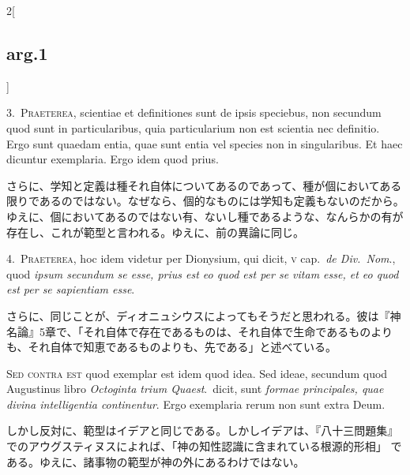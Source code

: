 \documentclass[paper=a4paper,fontsize=10pt,jafontsize=9pt,titlepage]{jlreq}
\begin{document}
\begin{paracol}{2}[\subsection{arg.1}]

3.~{\scshape Praeterea}, scientiae et definitiones sunt
de ipsis speciebus, non secundum quod sunt in particularibus, quia
particularium non est scientia nec definitio. Ergo sunt quaedam entia,
quae sunt entia vel species non in singularibus. Et haec dicuntur
exemplaria. Ergo idem quod prius.

\switchcolumn

さらに、学知と定義は種それ自体についてあるのであって、種が個においてある
 限りであるのではない。なぜなら、個的なものには学知も定義もないのだから。
ゆえに、個においてあるのではない有、ないし種であるような、なんらかの有が
 存在し、これが範型と言われる。ゆえに、前の異論に同じ。


4.~{\scshape Praeterea}, hoc idem videtur per Dionysium, qui dicit,
{\scshape v} cap.~{\itshape de Div.~Nom}., quod {\itshape ipsum secundum
se esse, prius est eo quod est per se vitam esse, et eo quod est per se
sapientiam esse}.

\switchcolumn

さらに、同じことが、ディオニュシウスによってもそうだと思われる。彼は『神
 名論』5章で、「それ自体で存在であるものは、それ自体で生命であるものより
 も、それ自体で知恵であるものよりも、先である」と述べている。

\switchcolumn*[\subsection{s.c.}]

{\scshape Sed contra est} quod exemplar est idem quod idea. Sed ideae,
secundum quod Augustinus libro {\itshape Octoginta trium Quaest}.~dicit,
sunt {\itshape formae principales, quae divina intelligentia
continentur}. Ergo exemplaria rerum non sunt extra Deum.

\switchcolumn

しかし反対に、範型はイデアと同じである。しかしイデアは、『八十三問題集』
 でのアウグスティヌスによれば、「神の知性認識に含まれている根源的形相」
 である。ゆえに、諸事物の範型が神の外にあるわけではない。



\end{paracol}
\end{document}
